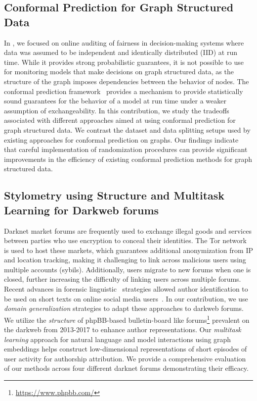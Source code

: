 \subsection{Conformal Prediction for Graph Structured Data}
In \AVOIRmethodname{}, we focused on online auditing of fairness in decision-making systems where data was assumed to be independent and identically distributed (IID) at run time.
While it provides strong probabilistic guarantees, it is not possible to use \AVOIRmethodname{} for monitoring models that make decisions on graph structured data, as the structure of the graph imposes dependencies between the behavior of nodes.
The conformal prediction framework~\citep{vovk2005algorithmic} provides a mechanism to provide statistically sound guarantees for the behavior of a model at run time under a weaker assumption of exchangeability.
In this contribution, we study the tradeoffs associated with different approaches aimed at using conformal prediction for graph structured data.
We contrast the dataset and data splitting setups used by existing approaches for conformal prediction on graphs.  
Our findings indicate that careful implementation of randomization procedures can provide significant improvements in the efficiency of existing conformal prediction methods for graph structured data.

\subsection{Stylometry using Structure and Multitask Learning for Darkweb forums}
Darknet market forums are frequently used to exchange illegal goods and services between parties who use encryption to conceal their identities.
The Tor network is used to host these markets, which guarantees additional anonymization from IP and location tracking, making it challenging to link across malicious users using multiple accounts (sybils).
Additionally, users migrate to new forums when one is closed, further increasing the difficulty of linking users across multiple forums. 
Recent advances in forensic linguistic~\citep{juola2008authorship} strategies allowed  author identification to be used on short texts on online social media users~\citep{shrestha2017convolutional,andrews2019learning}.
In our contribution, we use \textit{domain generalization} strategies to adapt these approaches to darkweb forums.
We utilize the \textit{structure} of phpBB-based bulletin-board like forums\footnote{\url{https://www.phpbb.com/}} prevalent on the darkweb from 2013-2017 to enhance author representations.
Our \textit{multitask learning} approach for natural language and model interactions using graph embeddings helps construct low-dimensional representations of short episodes of user activity for authorship attribution. 
We provide a comprehensive evaluation of our methods across four different darknet forums demonstrating their efficacy.

